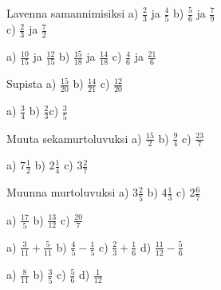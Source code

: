 
\begin{tehtava}
Lavenna samannimisiksi \quad
a) $\frac{2}{3}$ ja $\frac{4}{5}$ \quad b) $\frac{5}{6}$ ja $\frac{7}{9}$ \quad \\ c) $\frac{2}{3}$ ja $\frac{7}{2}$ 
\begin{vastaus}
a) $\frac{10}{15}$ ja $\frac{12}{15}$ \qquad b) $\frac{15}{18}$ ja $\frac{14}{18}$ \qquad c) $\frac{4}{6}$ ja $\frac{21}{6}$
\end{vastaus}
\end{tehtava}


\begin{tehtava}
Supista \quad
a) $\frac{15}{20}$ \qquad b) $\frac{14}{21}$ \qquad c) $\frac{12}{20}$
\begin{vastaus}
a) $\frac{3}{4}$ \qquad b) $\frac{2}{3}$\qquad c) $\frac{3}{5}$
\end{vastaus}
\end{tehtava}

\begin{tehtava}
Muuta sekamurtoluvuksi \quad
a) $\frac{15}{2}$ \qquad b) $\frac{9}{4}$ \qquad c) $\frac{23}{7}$
\begin{vastaus}
a) $7\frac{1}{2}$ \qquad b) $2\frac{1}{4}$ \qquad c) $3\frac{2}{7}$
\end{vastaus}
\end{tehtava}

\begin{tehtava}
Muunna murtoluvuksi \quad
a) $3\frac{2}{5}$ \qquad b) $4\frac{1}{3}$ \qquad c) $2\frac{6}{7}$
\begin{vastaus}
a) $\frac{17}{5}$ \qquad b) $\frac{13}{12}$ \qquad c) $\frac{20}{7}$
\end{vastaus}
\end{tehtava}

\begin{tehtava}
a) $\frac{3}{11}+\frac{5}{11}$ \qquad b) $\frac{4}{5}-\frac{1}{5}$ \qquad c) $\frac{2}{3}+\frac{1}{6}$ \qquad
d) $ \frac{11}{12}-\frac{5}{6}$
\begin{vastaus}
a) $\frac{8}{11}$ \qquad b) $\frac{3}{5}$ \qquad c) $\frac{5}{6}$ \qquad d) $\frac{1}{12}$
\end{vastaus}
\end{tehtava}

